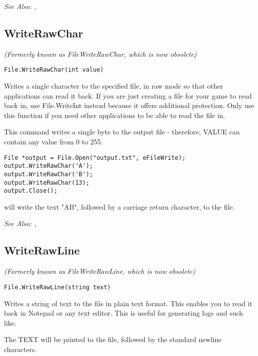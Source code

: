 \it{See Also:} , 


\subsection{WriteRawChar}\label{File.WriteRawChar}%

\it{(Formerly known as FileWriteRawChar, which is now obsolete)}

\begin{verbatim}
File.WriteRawChar(int value)
\end{verbatim}
Writes a single character to the specified file, in raw mode so that other
applications can read it back. If you are just creating a file for your
game to read back in, use File.WriteInt instead because it offers additional
protection. Only use this function if you need other applications to be
able to read the file in.

This command writes a single byte to the output file - therefore, VALUE can
contain any value from 0 to 255.

\begin{verbatim}
File *output = File.Open("output.txt", eFileWrite);
output.WriteRawChar('A');
output.WriteRawChar('B');
output.WriteRawChar(13);
output.Close();
\end{verbatim}
will write the text "AB", followed by a carriage return character, to the file.

\it{See Also:} , 


\subsection{WriteRawLine}\label{File.WriteRawLine}%

\it{(Formerly known as FileWriteRawLine, which is now obsolete)}

\begin{verbatim}
File.WriteRawLine(string text)
\end{verbatim}
Writes a string of text to the file in plain text format. This enables
you to read it back in Notepad or any text editor. This is useful for generating
logs and such like.

The TEXT will be printed to the file, followed by the standard newline characters.

